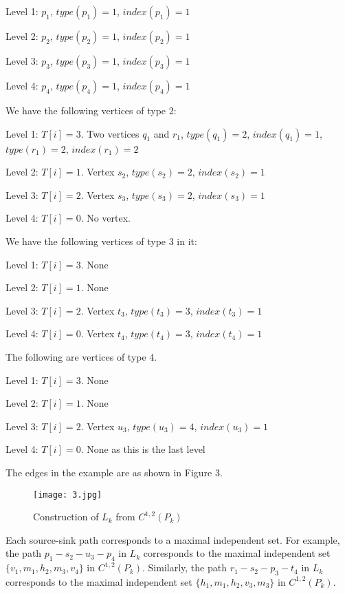 \documentclass[10pt]{article}
\begin{document}
 
\noindent Level 1: $p_1$, $type(p_1)=1$, $index(p_1)=1$
 
\noindent Level 2: $p_2$, $type(p_2)=1$, $index(p_2)=1$
 
\noindent Level 3: $p_3$, $type(p_3)=1$, $index(p_3)=1$
 
\noindent Level 4: $p_4$, $type(p_4)=1$, $index(p_4)=1$


We have the following vertices of type 2: 

\noindent Level 1: $T[i]=3$.  Two vertices $q_1$ and $r_1$, $type(q_1)=2$,
$index(q_1)=1$, $type(r_1)=2$, $index(r_1)=2$
 
\noindent Level 2: $T[i]=1$. Vertex $s_2$, $type(s_2)=2$, $index(s_2)=1$
 
\noindent Level 3: $T[i]=2$. Vertex $s_3$, $type(s_3)=2$, $index(s_3)=1$
 
\noindent Level 4: $T[i]=0$. No vertex. 


We have the following vertices of type 3 in it: 

\noindent Level 1: $T[i]=3$.  None 
 
\noindent Level 2: $T[i]=1$.  None
 
\noindent Level 3: $T[i]=2$.  Vertex $t_{3}$, $type(t_3)=3$, $index(t_3)=1$
 
\noindent Level 4: $T[i]=0$.  Vertex $t_{4}$, $type(t_4)=3$, $index(t_4)=1$


The following are vertices of type 4.

\noindent Level 1: $T[i]=3$.  None
 
\noindent Level 2: $T[i]=1$.  None
 
\noindent Level 3: $T[i]=2$. Vertex $u_3$, $type(u_3)=4$, $index(u_3)=1$
 
\noindent Level 4: $T[i]=0$. None as this is the last level


The edges in the example are as shown in Figure 3.

\begin{figure}[h]
 \centering
   \texttt{[image: 3.jpg]}
  \caption{Construction of $L_k$ from $C^{1,2}(P_k)$}
\end{figure}


Each source-sink path corresponds to a maximal independent set. For
example, the path $p_1-s_2-u_3-p_4$ in $L_k$ corresponds to the maximal
independent set $\{v_1,m_1,h_2,m_3,v_4\}$ in $C^{1,2}(P_k)$. Similarly,
the path $r_{1}-s_2-p_3-t_4$ in $L_k$ corresponds to the maximal
independent set $\{h_1,m_1,h_2,v_3,m_3\}$ in $C^{1,2}(P_k)$. 
\end{document}
